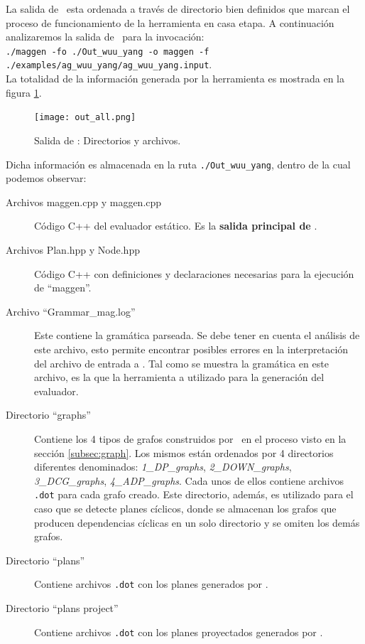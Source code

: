 La salida de \maggen\ esta ordenada a través de directorio bien definidos que marcan el proceso de funcionamiento de la herramienta en casa etapa. A continuación analizaremos la salida de \maggen\ para la invocación:\\

\small\texttt{./maggen -fo ./Out\_wuu\_yang -o maggen -f ./examples/ag\_wuu\_yang/ag\_wuu\_yang.input}.\\

La totalidad de la información generada por la herramienta es mostrada en la figura \ref{fig:outmagegn}.

\begin{figure}[h!]\centering
\texttt{[image: out\_all.png]}
\caption{\label{fig:outmagegn} Salida de \maggen: Directorios y archivos.}
\end{figure}

Dicha información es almacenada en la ruta \texttt{./Out\_wuu\_yang}, dentro de la cual podemos observar:

\begin{description}
\item [Archivos maggen.cpp y maggen.cpp] Código C++ del evaluador estático. Es la \textbf{salida principal de} \maggen.

\item [Archivos Plan.hpp y Node.hpp] Código C++ con definiciones y declaraciones necesarias para la ejecución de ``maggen''.

\item [Archivo ``Grammar\_mag.log''] Este contiene la gramática parseada. Se debe tener en cuenta el análisis de este archivo, esto permite encontrar posibles errores en la interpretación del archivo de entrada a \maggen. Tal como se muestra la gramática en este archivo, es la que la herramienta a utilizado para la generación del evaluador.

\item [Directorio ``graphs''] Contiene los 4 tipos de grafos construidos por \maggen\ en el proceso visto en la sección \ref{subsec:graph}. Los mismos están ordenados por 4 directorios diferentes denominados: \textit{1\_DP\_graphs}, \textit{2\_DOWN\_graphs}, \textit{3\_DCG\_graphs}, \textit{4\_ADP\_graphs}. Cada unos de ellos contiene archivos \texttt{.dot} para cada grafo creado. Este directorio, además, es utilizado para el caso que se detecte planes cíclicos, donde se almacenan los grafos que producen dependencias cíclicas en un solo directorio y se omiten los demás grafos.

\item [Directorio ``plans''] Contiene archivos \texttt{.dot} con los planes generados por \maggen.

\item [Directorio ``plans project''] Contiene archivos \texttt{.dot} con los planes proyectados generados por \maggen.
\end{description}

